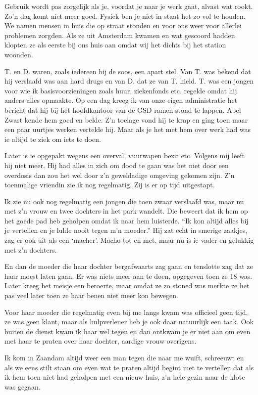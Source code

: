 \documentclass[10pt,twoside,openright]{memoir}
\begin{document}
Gebruik wordt pas zorgelijk als je, voordat je naar je werk gaat, alvast wat rookt. Zo’n dag komt niet meer goed. Fysiek ben je niet in staat het zo vol te houden. We namen mensen in huis die op straat stonden en voor ons weer voor allerlei problemen zorgden. Als ze uit Amsterdam kwamen en wat gescoord hadden klopten ze als eerste bij ons huis aan omdat wij het dichts bij het station woonden. 

T. en D. waren, zoals iedereen bij de soos, een apart stel. Van T. was bekend dat hij verslaafd was aan hard drugs en van D. dat ze van T. hield. T. was een jongen voor wie ik basisvoorzieningen zoals huur, ziekenfonds etc. regelde omdat hij anders alles opmaakte. Op een dag kreeg ik van onze eigen administratie het bericht dat hij bij het hoofdkantoor van de GSD ramen stond te lappen. Abel Zwart kende hem goed en belde. Z’n toelage vond hij te krap en ging toen maar een paar uurtjes werken vertelde hij. Maar als je het met hem over werk had was ie altijd te ziek om iets te doen. 

Later is ie opgepakt wegens een overval, vuurwapen bezit etc. Volgens mij leeft hij niet meer. Hij had alles in zich om dood te gaan was het niet door een overdosis dan zou het wel door z’n geweldadige omgeving gekomen zijn. Z’n toenmalige vriendin zie ik nog regelmatig. Zij is er op tijd uitgestapt.

Ik zie nu ook nog regelmatig een jongen die toen zwaar verslaafd was, maar nu met z’n vrouw en twee dochters in het park wandelt. Die beweert dat ik hem op het goede pad heb geholpen omdat ik naar hem luisterde. ``Ik kon altijd alles bij je vertellen en je lulde nooit tegen m’n moeder.'' Hij zat echt in smerige zaakjes, zag er ook uit als een ‘macher’. Macho tot en met, maar nu is ie vader en gelukkig met z’n dochters. 

En dan de moeder die haar dochter bergafwaarts zag gaan en tenslotte zag dat ze haar moest laten gaan. Er was niets meer aan te doen, opgegeven toen ze 18 was. Later kreeg het meisje een beroerte, maar omdat ze zo stoned was merkte ze het pas veel later toen ze haar benen niet meer kon bewegen. 

Voor haar moeder die regelmatig even bij me langs kwam was officieel geen tijd, ze was geen klant, maar als hulpverlener heb je ook daar natuurlijk een taak. Ook buiten de dienst kwam ik haar wel tegen en dan ontkwam je er niet aan om even met haar te praten over haar dochter, aardige vrouw overigens.

Ik kom in Zaandam altijd weer een man tegen die naar me wuift, schreeuwt en als we eens stilt staan om even wat te praten altijd begint met te vertellen dat als ik hem toen niet had geholpen met een nieuw huis, z’n hele gezin naar de klote was gegaan.
\end{document}
